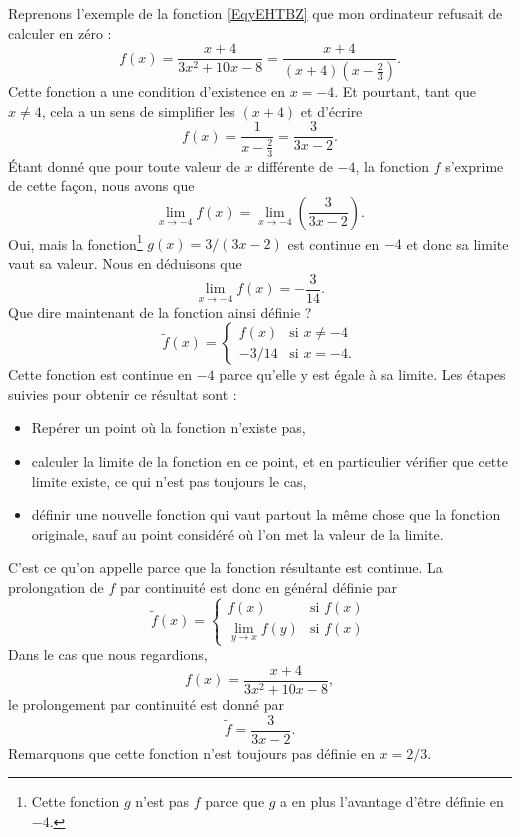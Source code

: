 Reprenons l'exemple de la fonction \eqref{EqyEHTBZ} que mon ordinateur refusait de calculer en zéro :
\begin{equation}
f(x)=\frac{ x+4 }{ 3x^2+10x-8 }=\frac{ x+4 }{ (x+4)\left( x-\frac{ 2 }{ 3 } \right) }.
\end{equation}
Cette fonction a une condition d'existence en $x=-4$. Et pourtant, tant que $x\neq 4$, cela a un sens de simplifier les $(x+4)$ et d'écrire
\[ 
  f(x)=\frac{ 1 }{ x-\frac{ 2 }{ 3 } }=\frac{ 3 }{ 3x-2 }.
\]
Étant donné que pour toute valeur de $x$ différente de $-4$, la fonction $f$ s'exprime de cette façon, nous avons que
\[ 
  \lim_{x\to -4}f(x)=\lim_{x\to -4}\left(\frac{ 3 }{ 3x-2 }\right).
\]
Oui, mais la fonction\footnote{Cette fonction $g$ n'est pas $f$ parce que $g$ a en plus l'avantage d'être définie en $-4$.} $g(x)=3/(3x-2)$ est continue en $-4$ et donc sa limite vaut sa valeur. Nous en déduisons que
\[ 
  \lim_{x\to -4}f(x)=-\frac{ 3 }{ 14 }.
\]
Que dire maintenant de la fonction ainsi définie ?
\begin{equation}
\tilde f(x)=
\begin{cases}
f(x)&\text{si }x\neq -4\\
-3/14&\text{si }x=-4.
\end{cases}
\end{equation}
Cette fonction est continue en $-4$ parce qu'elle y est égale à sa limite. Les étapes suivies pour obtenir ce résultat sont :
\begin{itemize}
\item Repérer un point où la fonction n'existe pas,
\item calculer la limite de la fonction en ce point, et en particulier vérifier que cette limite existe, ce qui n'est pas toujours le cas,
\item définir une nouvelle fonction qui vaut partout la même chose que la fonction originale, sauf au point considéré où l'on met la valeur de la limite.
\end{itemize}
C'est ce qu'on appelle  parce que la fonction résultante est continue. La prolongation de $f$ par continuité est donc en général définie par
\begin{equation}
\tilde f(x)=
\begin{cases}
f(x)            &\text{si }f(x)\\
\lim_{y\to x}f(y)   &\text{si }f(x)
\end{cases}
\end{equation}
Dans le cas que nous regardions, 
\[ 
    f(x)=\frac{ x+4 }{ 3x^2+10x-8 },
\]
le prolongement par continuité est donné par
\begin{equation}
\tilde f =\frac{ 3 }{ 3x-2 }.
\end{equation}
Remarquons que cette fonction n'est toujours pas définie en $x=2/3$. 

